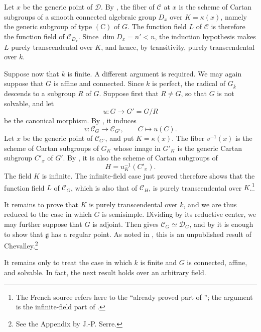 Let \(x\) be the generic point of \(\mathcal D\). By , the
fiber of \(\mathcal C\) at \(x\) is the scheme of Cartan
subgroups of a smooth connected algebraic group \(D_x\) over
\(K=\kappa(x)\), namely the generic subgroup of type
\((\mathrm C)\) of \(G\). The function field \(L\) of
\(\mathcal C\) is therefore the function field of
\(\mathcal C_{D_x}\). Since \(\dim D_x=n'<n\), the induction
hypothesis makes \(L\) purely transcendental over \(K\), and
hence, by transitivity, purely transcendental over \(k\).

Suppose now that \(k\) is finite. A different argument is
required. We may again suppose that \(G\) is affine and
connected. Since \(k\) is perfect, the radical of
\(G_{\bar k}\) descends to a subgroup \(R\) of \(G\).
Suppose first that \(R\ne G\), so that \(G\) is not solvable, and
let
\[
  u\colon G\longrightarrow G'=G/R
\]
be the canonical morphism. By \textup{}, it induces
\[
  v\colon\mathcal C_G\longrightarrow\mathcal C_{G'},
  \qquad C\longmapsto u(C).
\]
Let \(x\) be the generic point of \(\mathcal C_{G'}\), and put
\(K=\kappa(x)\). The fiber \(v^{-1}(x)\) is the scheme of Cartan
subgroups of \(G_K\) whose image in \(G'_K\) is the generic
Cartan subgroup \(C'_x\) of \(G'\). By \textup{}, it is
also the scheme of Cartan subgroups of
\[
  H=u_K^{-1}(C'_x).
\]
The field \(K\) is infinite. The infinite-field case just proved
therefore shows that the function field \(L\) of
\(\mathcal C_G\), which is also that of \(\mathcal C_H\), is
purely transcendental over \(K\).\footnote{The French source
refers here to the ``already proved part of ''; the argument
is the infinite-field part of .}

It remains to prove that \(K\) is purely transcendental over
\(k\), and we are thus reduced to the case in which \(G\) is
semisimple. Dividing by its reductive center, we may further
suppose that \(G\) is adjoint. Then  gives
\(\mathcal C_G\simeq\mathcal D_G\), and by  it is enough to
show that \(\mathfrak g\) has a regular point. As noted in ,
this is an unpublished result of Chevalley.\footnote{See the
Appendix by J.-P. Serre.}

It remains only to treat the case in which \(k\) is finite and
\(G\) is connected, affine, and solvable. In fact, the next
result holds over an arbitrary field.

